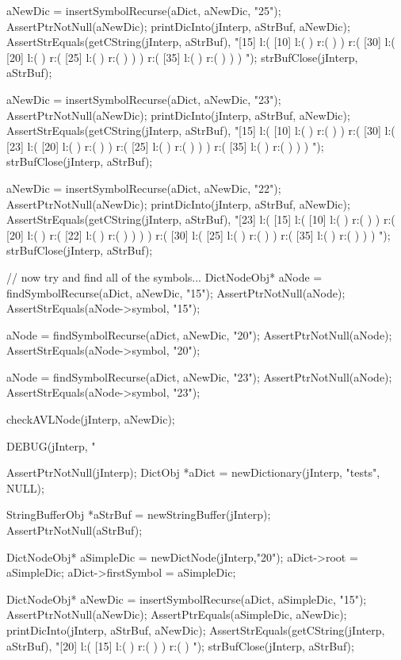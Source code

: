   aNewDic = insertSymbolRecurse(aDict, aNewDic, "25");
  AssertPtrNotNull(aNewDic);
  printDicInto(jInterp, aStrBuf, aNewDic);
  AssertStrEquals(getCString(jInterp, aStrBuf),
  "[15] l:( [10] l:(  ) r:(  )  ) r:( [30] l:( [20] l:(  ) r:( [25] l:(  ) r:(  )  )  ) r:( [35] l:(  ) r:(  )  )  ) ");
  strBufClose(jInterp, aStrBuf);

  aNewDic = insertSymbolRecurse(aDict, aNewDic, "23");
  AssertPtrNotNull(aNewDic);
  printDicInto(jInterp, aStrBuf, aNewDic);
  AssertStrEquals(getCString(jInterp, aStrBuf),
  "[15] l:( [10] l:(  ) r:(  )  ) r:( [30] l:( [23] l:( [20] l:(  ) r:(  )  ) r:( [25] l:(  ) r:(  )  )  ) r:( [35] l:(  ) r:(  )  )  ) ");
  strBufClose(jInterp, aStrBuf);
  
  aNewDic = insertSymbolRecurse(aDict, aNewDic, "22");
  AssertPtrNotNull(aNewDic);
  printDicInto(jInterp, aStrBuf, aNewDic);
  AssertStrEquals(getCString(jInterp, aStrBuf),
  "[23] l:( [15] l:( [10] l:(  ) r:(  )  ) r:( [20] l:(  ) r:( [22] l:(  ) r:(  )  )  )  ) r:( [30] l:( [25] l:(  ) r:(  )  ) r:( [35] l:(  ) r:(  )  )  ) ");
  strBufClose(jInterp, aStrBuf);
  
  // now try and find all of the symbols...
  DictNodeObj* aNode = findSymbolRecurse(aDict, aNewDic, "15");
  AssertPtrNotNull(aNode);
  AssertStrEquals(aNode->symbol, "15");

  aNode = findSymbolRecurse(aDict, aNewDic, "20");
  AssertPtrNotNull(aNode);
  AssertStrEquals(aNode->symbol, "20");

  aNode = findSymbolRecurse(aDict, aNewDic, "23");
  AssertPtrNotNull(aNode);
  AssertStrEquals(aNode->symbol, "23");

  checkAVLNode(jInterp, aNewDic);
\stopCTest
\stopTestCase


\startCTest
  DEBUG(jInterp, "\n%

  AssertPtrNotNull(jInterp);
  DictObj *aDict = newDictionary(jInterp, "tests", NULL);

  StringBufferObj *aStrBuf = newStringBuffer(jInterp);
  AssertPtrNotNull(aStrBuf);
  
  DictNodeObj* aSimpleDic = newDictNode(jInterp,"20");
  aDict->root             = aSimpleDic;
  aDict->firstSymbol      = aSimpleDic;

  DictNodeObj* aNewDic = insertSymbolRecurse(aDict, aSimpleDic, "15");
  AssertPtrNotNull(aNewDic);
  AssertPtrEquals(aSimpleDic, aNewDic);
  printDicInto(jInterp, aStrBuf, aNewDic);
  AssertStrEquals(getCString(jInterp, aStrBuf),
  "[20] l:( [15] l:(  ) r:(  )  ) r:(  ) ");
  strBufClose(jInterp, aStrBuf);
  
